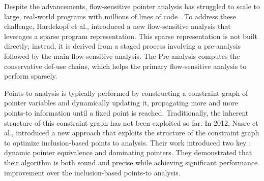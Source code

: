 Despite the advancements, flow-sensitive pointer analysis has struggled to scale to large, real-world programs with millions of lines of code \cite{hardekopf2011flow}.
To address these challenge, Hardekopf et al., \cite{hardekopf2011flow} introduced a new flow-sensitive analysis that leverages a sparse program representation.
This sparse representation is not built directly; instead, it is derived from a staged process involving a pre-analysis followed by the main flow-sensitive analysis.
The Pre-analysis computes the conservative def-use chains, which helps the primary flow-sensitive analysis to perform sparsely.


Points-to analysis is typically performed by constructing a constraint graph of pointer variables and dynamically updating it, propagating more and more points-to information until a fixed point is reached. \cite{nasre2012exploiting}
Traditionally, the inherent structure of this constraint graph has not been exploited so far. 
In 2012, Nasre et al., \cite{nasre2012exploiting} introduced a new approach that exploits the structure of the constraint graph to optimize inclusion-based points to analysis.
Their work introduced two key : dynamic pointer equivalence and dominating pointers.
They demonstrated that their algorithm is both sound and precise while achieving significant performance improvement over the inclusion-based points-to analysis.
